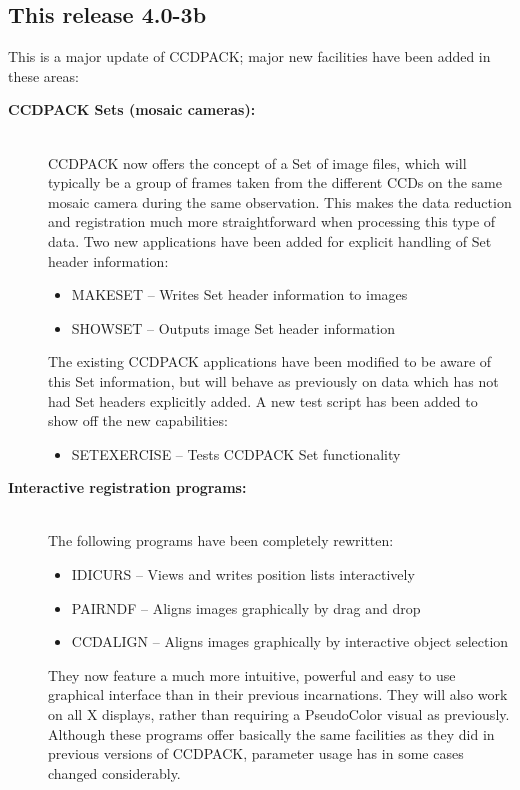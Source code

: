 \documentclass[twoside,11pt]{article}
\newcommand{\htmlref}[2]{#1}
\renewcommand{\_}{\texttt{\symbol{95}}}
\newcommand{\xroutine}[1]{\htmlref{{\sc #1}}{#1}}
\begin{document}
\subsection{This release 4.0-3b}

  This is a major update of CCDPACK; major new facilities have been
  added in these areas:

  \begin{description}
  \item[{\bf CCDPACK Sets (mosaic cameras):}]\mbox{}\\
     CCDPACK now offers the concept of a Set of image files, which will
     typically be a group of frames taken from the different CCDs on the
     same mosaic camera during the same observation.  This makes the
     data reduction and registration much more straightforward when
     processing this type of data.  Two new applications have been
     added for explicit handling of Set header information:
     \begin{itemize}
     \item \xroutine{MAKESET} -- Writes Set header information to images
     \item \xroutine{SHOWSET} -- Outputs image Set header information
     \end{itemize}
     The existing CCDPACK applications have been modified to
     be aware of this Set information, but will behave as previously
     on data which has not had Set headers explicitly added.
     A new test script has been added to show off the new capabilities:
     \begin{itemize}
     \item SETEXERCISE -- Tests CCDPACK Set functionality
     \end{itemize}

  \item[{\bf Interactive registration programs:}]\mbox{}\\
     The following programs have been completely rewritten:
     \begin{itemize}
     \item \xroutine{IDICURS} -- 
           Views and writes position lists interactively
     \item \xroutine{PAIRNDF} -- 
           Aligns images graphically by drag and drop
     \item \xroutine{CCDALIGN} -- 
           Aligns images graphically by interactive object selection
     \end{itemize}
     They now feature a much more intuitive, powerful and easy to use
     graphical interface than in their previous incarnations.  They
     will also work on all X displays, rather than requiring a
     PseudoColor visual as previously.  Although these programs offer
     basically the same facilities as they did in previous versions of
     CCDPACK, parameter usage has in some cases changed considerably.


\end{description}
\end{document}
